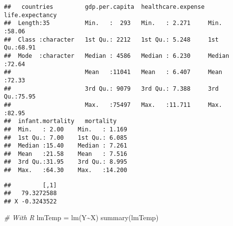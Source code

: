\documentclass[
]{article}
\newenvironment{Shaded}{\begin{snugshade}}{\end{snugshade}}
\newcommand{\AttributeTok}[1]{\textcolor[rgb]{0.77,0.63,0.00}{#1}}
\newcommand{\CommentTok}[1]{\textcolor[rgb]{0.56,0.35,0.01}{\textit{#1}}}
\newcommand{\DecValTok}[1]{\textcolor[rgb]{0.00,0.00,0.81}{#1}}
\newcommand{\DocumentationTok}[1]{\textcolor[rgb]{0.56,0.35,0.01}{\textbf{\textit{#1}}}}
\newcommand{\FunctionTok}[1]{\textcolor[rgb]{0.00,0.00,0.00}{#1}}
\newcommand{\NormalTok}[1]{#1}
\newcommand{\OtherTok}[1]{\textcolor[rgb]{0.56,0.35,0.01}{#1}}
\newcommand{\SpecialCharTok}[1]{\textcolor[rgb]{0.00,0.00,0.00}{#1}}
\newcommand{\StringTok}[1]{\textcolor[rgb]{0.31,0.60,0.02}{#1}}
\begin{document}
\begin{verbatim}
##   countries         gdp.per.capita  healthcare.expense life.expectancy
##  Length:35          Min.   :  293   Min.   : 2.271     Min.   :58.06  
##  Class :character   1st Qu.: 2212   1st Qu.: 5.248     1st Qu.:68.91  
##  Mode  :character   Median : 4586   Median : 6.230     Median :72.64  
##                     Mean   :11041   Mean   : 6.407     Mean   :72.33  
##                     3rd Qu.: 9079   3rd Qu.: 7.388     3rd Qu.:75.95  
##                     Max.   :75497   Max.   :11.711     Max.   :82.95  
##  infant.mortality   mortality     
##  Min.   : 2.00    Min.   : 1.169  
##  1st Qu.: 7.00    1st Qu.: 6.085  
##  Median :15.40    Median : 7.261  
##  Mean   :21.58    Mean   : 7.516  
##  3rd Qu.:31.95    3rd Qu.: 8.995  
##  Max.   :64.30    Max.   :14.200
\end{verbatim}

\begin{Shaded}
\end{Shaded}

\begin{verbatim}
##         [,1]
##   79.3272588
## X -0.3243522
\end{verbatim}

\begin{Shaded}
\begin{Highlighting}[]
\CommentTok{\# With R}
\NormalTok{lmTemp }\OtherTok{=} \FunctionTok{lm}\NormalTok{(Y}\SpecialCharTok{\textasciitilde{}}\NormalTok{X)}
\FunctionTok{summary}\NormalTok{(lmTemp)}
\end{Highlighting}
\end{Shaded}
\end{document}
